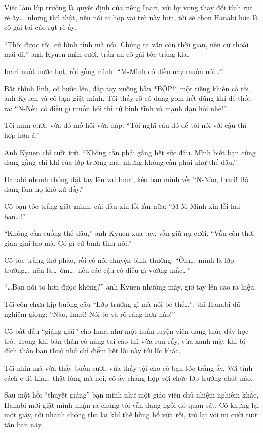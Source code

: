 \documentclass[../main.tex]{subfiles}
\begin{document}
Việc làm lớp trưởng là quyết định của riêng Inari, với hy vọng thay đổi tính rụt rè ấy\dots\ nhưng thú thật, nếu nói ai hợp vai trò này hơn, tôi sẽ chọn Hanabi hơn là cô gái tai cáo rụt rè ấy.

\chrint

``Thôi được rồi, cứ bình tĩnh mà nói. Chúng ta vẫn còn thời gian, nên cứ thoải mái đi,'' anh Kyuen mỉm cười, trấn an cô gái tóc trắng kia.

Inari nuốt nước bọt, rồi gồng mình: ``M-Mình có điều này muốn nói\dots''

Bất thình lình, cô bước lên, đập tay xuống bàn *BỘP!* một tiếng khiến cả tôi, anh Kyuen và cô bạn giật mình. Tôi thấy rõ cô đang gom hết dũng khí để thốt ra: ``N-Nếu có điều gì muốn hỏi thì cứ bình tĩnh và mạnh dạn hỏi nhé!''

Tôi mỉm cười, vừa đổ mồ hôi vừa đáp: ``Tôi nghĩ câu đó để tôi nói với cậu thì hợp hơn á.''

Anh Kyuen chỉ cười trừ. ``Không cần phải gắng hết sức đâu. Mình biết bạn cũng đang gắng chí khí của lớp trưởng mà, nhưng không cần phải như thế đâu.''

Hanabi nhanh chóng đặt tay lên vai Inari, kéo bạn mình về: ``N-Nào, Inari! Bà đang làm họ khó xử đấy.''

Cô bạn tóc trắng giật mình, cúi đầu xin lỗi lần nữa: ``M-M-Mình xin lỗi hai bạn\dots!''

``Không cần cuống thế đâu,''  anh Kyuen xua tay, vẫn giữ nụ cười. ``Vẫn còn thời gian giải lao mà. Có gì cứ bình tĩnh nói.''

Cô tóc trắng thở phào, rồi cố nói chuyện bình thường: ``Ờm\dots\ mình là lớp trưởng\dots\ nên là\dots\ ờm\dots\ nếu các cậu có điều gì vướng mắc\dots''

``\dots Bạn nói to hơn được không?'' anh Kyuen nhướng mày, giơ tay lên cao ra hiệu.

Tôi còn chưa kịp buông câu ``Lớp trưởng gì mà nói bé thế\dots'', thì Hanabi đã nghiêm giọng: ``Nào, Inari! Nói to và rõ ràng hơn nào!''

Cô bắt đầu ``giảng giải'' cho Inari như một huấn luyện viên đang thúc đẩy học trò. Trong khi bản thân cô nàng tai cáo thì vừa run rẩy, vừa xanh mặt khi bị đích thân bạn thuở nhỏ chỉ điểm hết lỗi này tới lỗi khác.

Tôi nhìn mà vừa thấy buồn cười, vừa thấy tội cho cô bạn tóc trắng ấy. Với tính cách e dè kia\dots\ thật lòng mà nói, cô ấy chẳng hợp với chức lớp trưởng chút nào.

Sau một hồi ``thuyết giảng'' bạn mình như một giáo viên chủ nhiệm nghiêm khắc, Hanabi mới giật mình nhận ra chúng tôi vẫn đang ngồi đó quan sát. Cô khựng lại một giây, rồi nhanh chóng thu lại khí thế hùng hổ vừa rồi, trở lại với nụ cười tươi tắn ban nãy.
\end{document}

